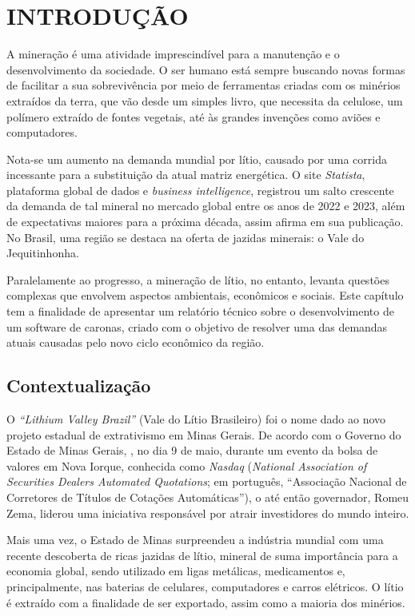 \chapter{INTRODUÇÃO}

A mineração é uma atividade imprescindível para a manutenção e o desenvolvimento da sociedade. O ser humano está sempre buscando novas formas de facilitar a sua sobrevivência por meio de ferramentas criadas com os minérios extraídos da terra, que vão desde um simples livro, que necessita da celulose, um polímero extraído de fontes vegetais, até às grandes invenções como aviões e computadores.

Nota-se um aumento na demanda mundial por lítio, causado por uma corrida incessante para a substituição da atual matriz energética. O site \textit{Statista}, plataforma global de dados e \textit{business intelligence}, registrou um salto crescente da demanda de tal mineral no mercado global entre os anos de 2022 e 2023, além de expectativas maiores para a próxima década, assim afirma  em sua publicação. No Brasil, uma região se destaca na oferta de jazidas minerais: o Vale do Jequitinhonha.

Paralelamente ao progresso, a mineração de lítio, no entanto, levanta questões complexas que envolvem aspectos ambientais, econômicos e sociais. Este capítulo tem a finalidade de apresentar um relatório técnico sobre o desenvolvimento de um software de caronas, criado com o objetivo de resolver uma das demandas atuais causadas pelo novo ciclo econômico da região.


\section{Contextualização}

O \textit{“Lithium Valley Brazil”} (Vale do Lítio Brasileiro) foi o nome dado ao novo projeto estadual de extrativismo em Minas Gerais. De acordo com o Governo do Estado de Minas Gerais, , no dia 9 de maio, durante um evento da bolsa de valores em Nova Iorque, conhecida como \textit{Nasdaq} (\textit{National Association of Securities Dealers Automated Quotations}; em português, ``Associação Nacional de Corretores de Títulos de Cotações Automáticas''), o até então governador, Romeu Zema, liderou uma iniciativa responsável por atrair investidores do mundo inteiro. 

Mais uma vez, o Estado de Minas surpreendeu a indústria mundial com uma recente descoberta de ricas jazidas de lítio, mineral de suma importância para a economia global, sendo utilizado em ligas metálicas, medicamentos e, principalmente, nas baterias de celulares, computadores e carros elétricos. O lítio é extraído com a finalidade de ser exportado, assim como a maioria dos minérios.

